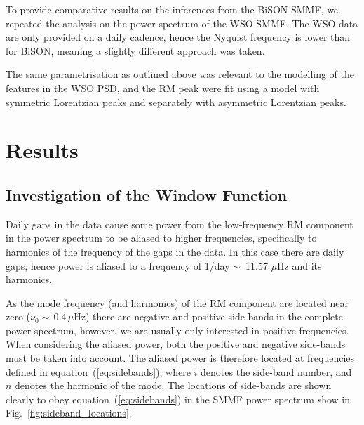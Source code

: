 To provide comparative results on the inferences from the BiSON SMMF, we repeated the analysis on the power spectrum of the WSO SMMF. The WSO data are only provided on a daily cadence, hence the Nyquist frequency is lower than for BiSON, meaning a slightly different approach was taken.

The same parametrisation as outlined above was relevant to the modelling of the features in the WSO PSD, and the RM peak were fit using a model with symmetric Lorentzian peaks and separately with asymmetric Lorentzian peaks.


\section{Results}\label{sec:SMMF_reults}

\subsection{Investigation of the Window Function}\label{sec:window_fn}


Daily gaps in the data cause some power from the low-frequency RM component in the power spectrum to be aliased to higher frequencies, specifically to harmonics of the frequency of the gaps in the data. In this case there are daily gaps, hence power is aliased to a frequency of 1/day $\sim$~11.57 $\mu$Hz and its harmonics.

As the mode frequency (and harmonics) of the RM component are located near zero ($\nu_0 \sim \,0.4 \, \mu\mathrm{Hz}$) there are negative and positive side-bands in the complete power spectrum, however, we are usually only interested in positive frequencies. When considering the aliased power, both the positive and negative side-bands must be taken into account. The aliased power is therefore located at frequencies defined in equation~(\ref{eq:sidebands}), where $i$ denotes the side-band number, and $n$ denotes the harmonic of the mode. The locations of side-bands are shown clearly to obey equation~(\ref{eq:sidebands}) in the SMMF power spectrum show in Fig.~\ref{fig:sideband_locations}.

